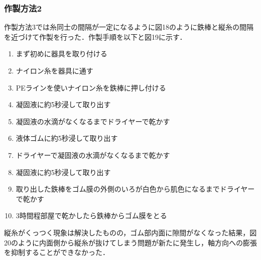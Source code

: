 \subsubsection{作製方法2}
作製方法3では糸同士の間隔が一定になるように図18のように鉄棒と縦糸の間隔を近づけて作製を行った．作製手順を以下と図19に示す．
\begin{enumerate}
  \item まず初めに器具を取り付ける
  \item ナイロン糸を器具に通す
  \item PEラインを使いナイロン糸を鉄棒に押し付ける
  \item 凝固液に約5秒浸して取り出す
  \item 凝固液の水滴がなくなるまでドライヤーで乾かす
  \item 液体ゴムに約5秒浸して取り出す
  \item ドライヤーで凝固液の水滴がなくなるまで乾かす
  \item 凝固液に約5秒浸して取り出す
  \item 取り出した鉄棒をゴム膜の外側のいろが白色から肌色になるまでドライヤーで乾かす
  \item 3時間程部屋で乾かしたら鉄棒からゴム膜をとる
\end{enumerate}
縦糸がくっつく現象は解決したものの，ゴム部内面に隙間がなくなった結果，図20のように内面側から縦糸が抜けてしまう問題が新たに発生し，軸方向への膨張を抑制することができなかった．
